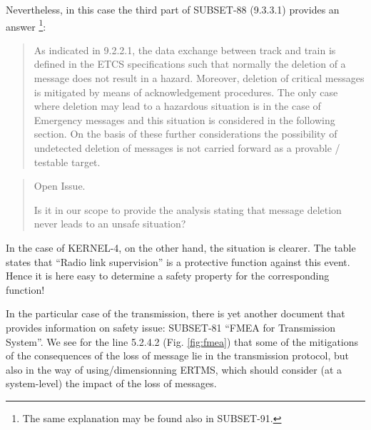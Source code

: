 \documentclass{template/openetcs_article}
\newenvironment{issue}{
	\begin{quote}
	\begin{itshape}Open Issue. 
}{
	\end{itshape}
	\end{quote}
}
\begin{document}
Nevertheless, in this case the third part of SUBSET-88 (9.3.3.1) provides an answer \footnote{
The same explanation may be found also in SUBSET-91.}:
\begin{quote}
As indicated in 9.2.2.1, the data exchange between track and train is defined in the
ETCS specifications such that normally the deletion of a message does not result in a
hazard. Moreover, deletion of critical messages is mitigated by means of
acknowledgement procedures. The only case where deletion may lead to a hazardous
situation is in the case of Emergency messages and this situation is considered in the
following section. On the basis of these further considerations the possibility of
undetected deletion of messages is not carried forward as a provable / testable target.
\end{quote}

\begin{issue}
Is it in our scope to provide the analysis stating that message deletion never leads to 
an unsafe situation?
\end{issue}

In the case of KERNEL-4, on the other hand, the situation is clearer. The table states that 
``Radio link supervision'' is a protective function against this event. Hence it is here easy to
determine a safety property for the corresponding function!

In the particular case of the transmission, there is yet another document that provides 
information on safety issue: SUBSET-81 ``FMEA for Transmission System''. We see for the 
line 5.2.4.2 (Fig. \ref{fig:fmea}) that some of the mitigations of the consequences of the loss
of message lie in the transmission protocol, but also in the way of using/dimensionning ERTMS,
which should consider (at a system-level) the impact of the loss of messages.
\end{document}

